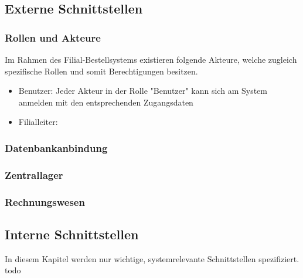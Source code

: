 \subsection{Externe Schnittstellen}
\subsubsection{Rollen und Akteure}
Im Rahmen des Filial-Bestellsystems existieren folgende Akteure, welche zugleich spezifische Rollen und somit Berechtigungen besitzen.
\begin{itemize}
	\item Benutzer: Jeder Akteur in der Rolle "Benutzer" kann sich am System anmelden mit den entsprechenden Zugangsdaten
	\item Filialleiter: 
\end{itemize}
\subsubsection{Datenbankanbindung}
\subsubsection{Zentrallager}
\subsubsection{Rechnungswesen}


\subsection{Interne Schnittstellen}
In diesem Kapitel werden nur wichtige, systemrelevante Schnittstellen spezifiziert.
todo
